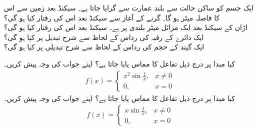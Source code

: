 
ایک جسم کو ساکن حالت سے  بلند عمارت سے گرایا جاتا ہے۔ سیکنڈ بعد زمین سے اس کا فاصلہ  میٹر  ہو گا۔ گرنے  کے   آغاز  سے   سیکنڈ بعد اس کی رفتار کیا ہو گی؟\\
اڑان کے  سیکنڈ بعد ایک مزائل  میٹر  بلندی پر ہے۔ سیکنڈ بعد اس کی رفتار کیا ہو گی؟
ایک دائرے کے رقبہ  کی رداس  کے لحاظ سے شرح تبدیل   پر کیا ہو گی؟ \\
\wf{\unexpanded{
$6\pi$}}
ایک گیند کے حجم  کی رداس  کے لحاظ سے شرح تبدیلی  پر کیا ہو گی؟


کیا مبدا پر درج ذیل تفاعل کا مماس پایا جاتا ہے؟ اپنے جواب کی وجہ پیش کریں۔
\begin{align*}
f(x)=\begin{cases}x^2\sin \tfrac{1}{x},& x\ne 0\\ 0,&x=0  \end{cases}
\end{align*}
کیا مبدا پر درج ذیل تفاعل کا مماس پایا جاتا ہے؟ اپنے جواب کی وجہ پیش کریں۔
\begin{align*}
f(x)=\begin{cases}x\sin \tfrac{1}{x},& x\ne 0\\ 0,&x=0  \end{cases}
\end{align*}

